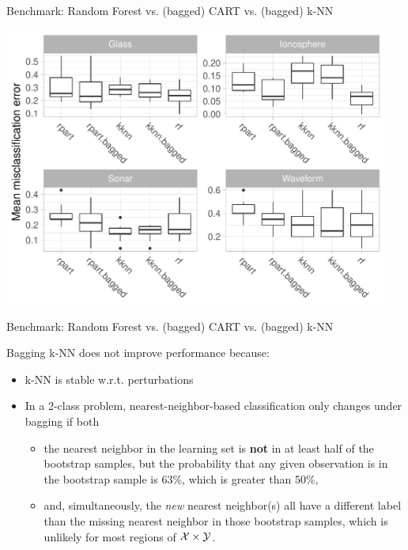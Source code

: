 \documentclass[11pt,compress,t,notes=noshow, xcolor=table]{beamer}
\begin{document}
\begin{vbframe}{Benchmark: Random Forest vs. (bagged) CART vs. (bagged) k-NN}
\framebreak

\begin{center}\includegraphics[width=0.95\textwidth]{figure_man/bm_stable_vs_unstable.pdf}\end{center}{}


\end{vbframe}

\begin{vbframe}{Benchmark: Random Forest vs. (bagged) CART vs. (bagged) k-NN}

  Bagging k-NN does not improve performance because:

  \begin{itemize}
    \item k-NN is stable w.r.t. perturbations
    \item In a 2-class problem, nearest-neighbor-based classification only changes under bagging if both
    \begin{itemize}
    \item the nearest neighbor in the learning set is \textbf{not} in at least half of the bootstrap samples, but the probability that any given observation is in the bootstrap sample is 63\%, which is greater than 50\%,
    \item and, simultaneously, the \emph{new} nearest neighbor(s) all have a different label than the missing nearest neighbor in those bootstrap samples, which is unlikely for most regions of $\mathcal{X} \times \mathcal{Y}$.
    \end{itemize}
\end{itemize}
\end{vbframe}


\endlecture
\end{document}
